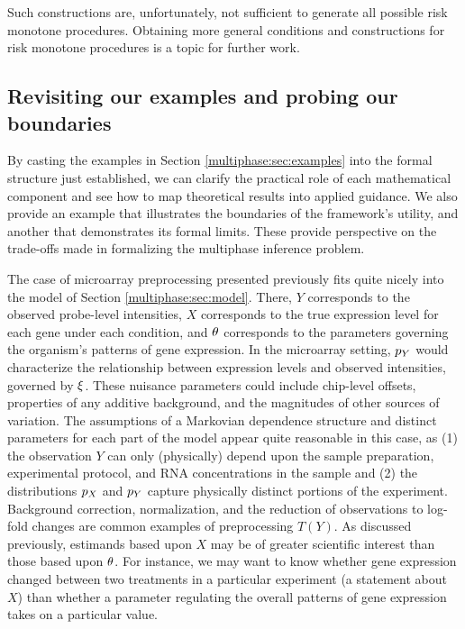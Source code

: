 Such constructions are, unfortunately, not sufficient to generate all possible risk monotone procedures.
Obtaining more general conditions and constructions for risk monotone procedures is a topic for further work.

\subsection{Revisiting our examples and probing our boundaries}
\label{multiphase:sec:revisit}

By casting the examples in Section \ref{multiphase:sec:examples} into the formal structure just established, we can clarify the practical role of each mathematical component and see how to map theoretical results into applied guidance.
We also provide an example  that illustrates the boundaries of the framework's utility, and another that demonstrates its formal limits.
These provide perspective on the trade-offs made in formalizing the multiphase inference problem. 

The case of microarray preprocessing presented previously fits quite nicely into the model of Section \ref{multiphase:sec:model}.
There, $Y$ corresponds to the observed probe-level intensities, $X$ corresponds to the true expression level for each gene under each condition, and $\theta$ corresponds to the parameters governing the organism's patterns of gene expression.
In the microarray setting, $p_Y$ would characterize the relationship between expression levels and observed intensities, governed by $\xi$.
These nuisance parameters could include chip-level offsets, properties of any additive background, and the magnitudes of other sources of variation.
The assumptions of a Markovian dependence structure and distinct parameters for each part of the model appear quite reasonable in this case, as (1) the observation $Y$ can only (physically) depend upon the sample preparation, experimental protocol, and RNA concentrations in the sample and (2) the distributions $p_X$ and $p_Y$ capture physically distinct portions of the experiment.
Background correction, normalization, and the reduction of observations to log-fold changes are common examples of preprocessing $T(Y)$. As discussed previously, estimands based upon $X$ may be of greater scientific interest than those based upon $\theta$.
For instance, we may want to know  whether gene expression changed between two treatments in a particular experiment (a statement about $X$) than whether a parameter regulating the overall patterns of gene expression takes on a particular value.

